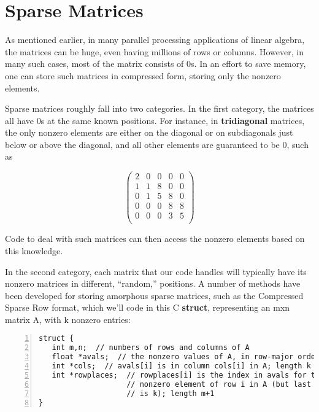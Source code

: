 \section{Sparse Matrices}
\label{sparse}

As mentioned earlier, in many parallel processing applications of linear
algebra, the matrices can be huge, even having millions of rows or
columns.  However, in many such cases, most of the matrix consists of
0s.  In an effort to save memory, one can store such matrices in
compressed form, storing only the nonzero elements. 

Sparse matrices roughly fall into two categories.  In the first
category, the matrices all have 0s at the same known positions.  For
instance, in {\bf tridiagonal} matrices, the only nonzero elements are
either on the diagonal or on subdiagonals just below or above the
diagonal, and all other elements are guaranteed to be 0, such as  

\begin{equation}
\label{amat}
\left (
\begin{array}{rrrrr}
2 & 0 & 0 & 0 & 0 \\
1 & 1 & 8 & 0 & 0 \\
0 & 1 & 5 & 8 & 0 \\
0 & 0 & 0 & 8 & 8 \\
0 & 0 & 0 & 3 & 5 \\
\end{array} 
\right ) 
\end{equation}

Code to deal with such matrices can then access the nonzero elements
based on this knowledge.

In the second category, each matrix that our code handles will typically
have its nonzero matrices in different, ``random,'' positions.  A
number of methods have been developed for storing amorphous sparse
matrices, such as the Compressed Sparse Row format, which we'll code in
this C {\bf struct}, representing an mxn matrix A, with k nonzero
entries:

\begin{lstlisting}[numbers=left]
struct {
   int m,n;  // numbers of rows and columns of A
   float *avals;  // the nonzero values of A, in row-major order; length k
   int *cols;  // avals[i] is in column cols[i] in A; length k
   int *rowplaces;  // rowplaces[i] is the index in avals for the 1st
                    // nonzero element of row i in A (but last element
                    // is k); length m+1
}
\end{lstlisting}

